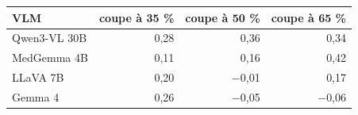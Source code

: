 \begin{tabular}{lrrr}
\toprule
VLM & coupe à 35 \% & coupe à 50 \% & coupe à 65 \% \\
\midrule
Qwen3-VL 30B & 0,28 & 0,36 & 0,34 \\
MedGemma 4B & 0,11 & 0,16 & 0,42 \\
LLaVA 7B & 0,20 & $-$0,01 & 0,17 \\
Gemma 4 & 0,26 & $-$0,05 & $-$0,06 \\
\bottomrule
\end{tabular}
